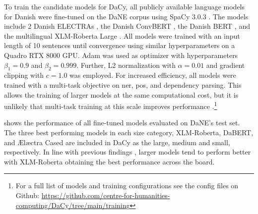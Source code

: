 \documentclass{article}
\begin{document}
To train the candidate models for DaCy, all publicly available language models for Danish were fine-tuned on the DaNE corpus \parencite{hvingelby_dane_2020} using SpaCy 3.0.3 \parencite{honnibal_spacy_2020}. The models include 2 Danish ELECTRAs \parencite{clark_electra_2020, hojmark-bertelsen_aelaectra_2021, tamini-sarnikowski_danish_2020}, the Danish ConvBERT \parencite{jiang_convbert_2021, tamini-sarnikowski_danish_2020}, the Danish BERT \parencite{devlin_bert_2019, mollerhoj_danish_2019}, and the multilingual XLM-Roberta Large \parencite{conneau_unsupervised_2020}. All models were trained with an input length of 10 sentences until convergence using similar hyperparameters on a Quadro RTX 8000 GPU. Adam was used as optimizer with hyperparameters $\beta_1= 0.9$ and $\beta_2 = 0.999$. Further, L2 normalization with $\alpha=0.01$ and gradient clipping with $c=1.0$ was employed. For increased efficiency, all models were trained with a multi-task objective \parencite{caruana_multitask_1997, ruder_overview_2017} on  \gls{ner}, \gls{pos}, and dependency parsing. This allows the training of larger models at the same computational cost, but it is unlikely that multi-task training at this scale improves performance \parencite{raffel_exploring_2020, aghajanyan_muppet_2021}.\footnote{For a full list of models and training configurations see the config files on Github: \url{https://github.com/centre-for-humanities-computing/DaCy/tree/main/training}}

 shows the performance of all fine-tuned models evaluated on DaNE's test set. The three best performing models in each size category, XLM-Roberta, DaBERT, and Ælæctra Cased are included in DaCy as the large, medium and small, respectively. In line with previous findings \parencite{raffel_exploring_2020, brown_language_2020, radford_language_2019}, larger models tend to perform better with XLM-Roberta obtaining the best performance across the board. 
\end{document}
